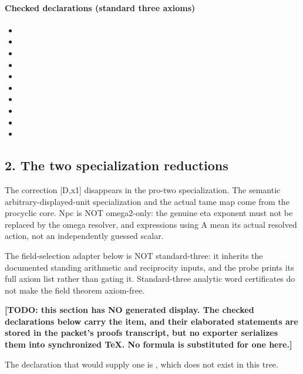 \paragraph{Checked declarations (standard three axioms)}
\begin{itemize}
\item {}
\item {}
\item {}
\item {}
\item {}
\item {}
\item {}
\item {}
\item {}
\item {}
\end{itemize}

\subsection*{2. The two specialization reductions}
The correction [D,x1] disappears in the pro-two specialization. The semantic arbitrary-displayed-unit specialization and the actual tame map come from the procyclic core. Npc is NOT omega2-only: the genuine eta exponent must not be replaced by the omega resolver, and expressions using A mean its actual resolved action, not an independently guessed scalar.

The field-selection adapter below is NOT standard-three: it inherits the documented standing arithmetic and reciprocity inputs, and the probe prints its full axiom list rather than gating it. Standard-three analytic word certificates do not make the field theorem axiom-free.

\par\noindent\textbf{[TODO: this section has NO generated display. The checked declarations below carry the item, and their elaborated statements are stored in the packet's proofs transcript, but no exporter serializes them into synchronized TeX. No formula is substituted for one here.]}
\par\noindent The declaration that would supply one is , which does not exist in this tree.
